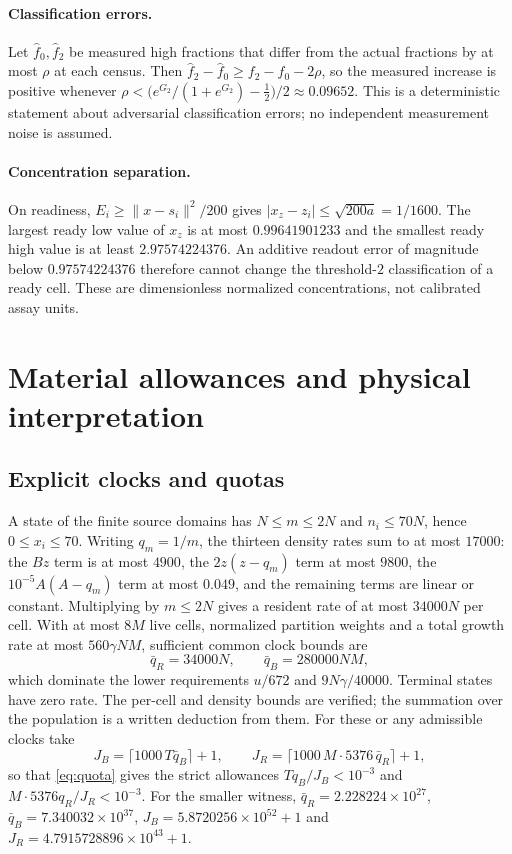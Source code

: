 \documentclass[11pt,a4paper]{article}
\theoremstyle{plain}
\theoremstyle{definition}
\theoremstyle{remark}
\begin{document}
\paragraph{Classification errors.}
Let $\widehat f_0,\widehat f_2$ be measured high fractions that differ from the actual fractions by at most $\rho$ at each census. Then $\widehat f_2-\widehat f_0\ge f_2-f_0-2\rho$, so the measured increase is positive whenever $\rho<\bigl(e^{G_2}/(1+e^{G_2})-\frac12\bigr)/2\approx0.09652$. This is a deterministic statement about adversarial classification errors; no independent measurement noise is assumed.

\paragraph{Concentration separation.}
On readiness, $E_i\ge\|x-s_i\|^2/200$ gives $|x_z-z_i|\le\sqrt{200a}=1/1600$. The largest ready low value of $x_z$ is at most $0.99641901233$ and the smallest ready high value is at least $2.97574224376$. An additive readout error of magnitude below $0.97574224376$ therefore cannot change the threshold-$2$ classification of a ready cell. These are dimensionless normalized concentrations, not calibrated assay units.

\section{Material allowances and physical interpretation}\label{sec:budgets}

\subsection{Explicit clocks and quotas}\label{sec:clocks}
A state of the finite source domains has $N\le m\le2N$ and $n_i\le70N$, hence $0\le x_i\le70$. Writing $q_m=1/m$, the thirteen density rates sum to at most $17000$: the $Bz$ term is at most $4900$, the $2z(z-q_m)$ term at most $9800$, the $10^{-5}A(A-q_m)$ term at most $0.049$, and the remaining terms are linear or constant. Multiplying by $m\le2N$ gives a resident rate of at most $34000N$ per cell. With at most $8M$ live cells, normalized partition weights and a total growth rate at most $560\gamma NM$, sufficient common clock bounds are
\begin{equation}\label{eq:clocks}
\bar q_R=34000N,\qquad \bar q_B=280000NM,
\end{equation}
which dominate the lower requirements $u/672$ and $9N\gamma/40000$. Terminal states have zero rate. The per-cell and density bounds are verified; the summation over the population is a written deduction from them. For these or any admissible clocks take
\begin{equation}\label{eq:quotasexplicit}
J_B=\lceil1000\,T\bar q_B\rceil+1,\qquad J_R=\lceil1000\,M\cdot5376\,\bar q_R\rceil+1,
\end{equation}
so that \eqref{eq:quota} gives the strict allowances $Tq_B/J_B<10^{-3}$ and $M\cdot5376q_R/J_R<10^{-3}$. For the smaller witness, $\bar q_R=2.228224\times10^{27}$, $\bar q_B=7.340032\times10^{37}$, $J_B=5.8720256\times10^{52}+1$ and $J_R=4.7915728896\times10^{43}+1$.
\end{document}

